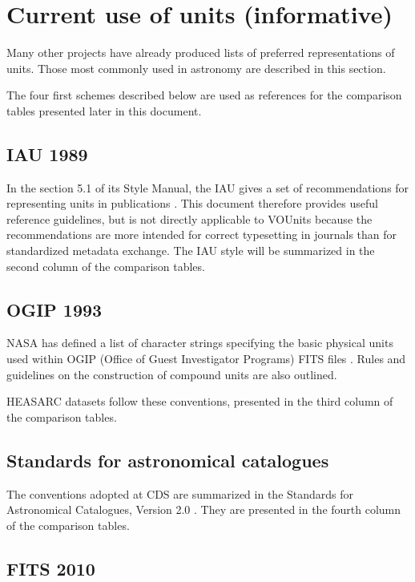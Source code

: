 \documentclass[11pt,notitlepage,onecolumn]{ivoa}
\begin{document}
\section{Current use of units (informative)}
\label{appx:current}

Many other projects have already produced lists of preferred
representations of units. Those most commonly used in
astronomy are described in this section. 

The four first schemes described below are used as references for the
comparison tables presented later in this document.

\subsection{IAU 1989\label{appx:IAU}}

In the section 5.1 of its Style Manual, the IAU gives a set
of recommendations for representing units in publications \citep{wilkins89}. This document
therefore provides useful reference guidelines, but is not directly
applicable to VOUnits because the recommendations are more intended
for correct typesetting in journals than for standardized metadata exchange.
The IAU style will be summarized in the second column of the comparison tables.

\subsection{OGIP 1993}

NASA has defined a list of character strings specifying the basic physical units 
used within OGIP (Office of Guest Investigator Programs) FITS files \citep{george95}. Rules and guidelines on the construction 
of compound units are also outlined. 

HEASARC datasets follow these conventions, presented in the third column
of the comparison tables.

\subsection{Standards for astronomical catalogues}

The conventions adopted at CDS are summarized in the Standards for Astronomical 
Catalogues, Version 2.0 \citep[\S3.2]{cds00}. They are presented in the fourth column
of the comparison tables.

\subsection{FITS 2010}
\end{document}
